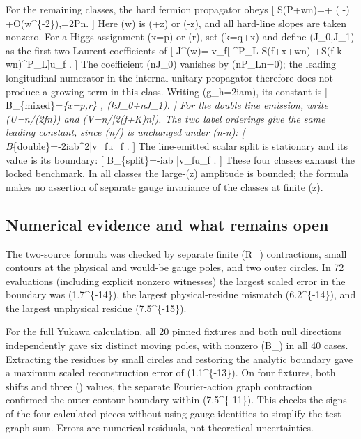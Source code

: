 \documentclass[
  11pt,
]{article}
\begin{document}
For the remaining classes, the hard fermion propagator obeys {[}
S(P+wn)=+ \left(
-\right)
+O(w\^{}\{-2\}),\qquad \ell=2P\cdot n. {]} Here (w) is (+z) or (-z), and
all hard-line slopes are taken nonzero. For a Higgs assignment (x=p) or
(r), set (k=q+x) and define (J\_0,J\_1) as the first two Laurent
coefficients of {[} J\^{}\alpha(w)=\bar v\_f{[} \gamma\^{}\alpha P\_L
S(f+x+wn) +S(f-k-wn)\gamma\^{}\alpha P\_L{]}u\_f . {]} The coefficient
(n\cdot J\_0) vanishes by (\not nP\_L\not n=0); the leading longitudinal
numerator in the internal unitary propagator therefore does not produce
a growing term in this class. Writing (g\_h=2iam), its constant is {[}
B\_\{\rm mixed\}=\sum\emph{\{x=p,r\}
, (k\cdot J\_0+n\cdot J\_1).
{]} For the double line emission, write (U=\not n/(2f\cdot n)) and
(V=\not n/{[}2(f+K)\cdot n{]}). The two label orderings give the same
leading constant, since (\not n/\ell) is unchanged under (n\to-n): {[}
B}\{\rm double\}=-2iab\^{}2\bar v\_f\big[
 W S(f+p+r)U+V W U+V S(f+K)W\big]u\_f . {]} The line-emitted scalar
split is stationary and its value is its boundary: {[}
B\_\{\rm split\}=-iab
\bar v\_f\big[W S(f+p+r)+S(f+K)W\big]u\_f . {]} These four classes
exhaust the locked benchmark. In all classes the large-(z) amplitude is
bounded; the formula makes no assertion of separate gauge invariance of
the classes at finite (z).

\subsection{Numerical evidence and what remains
open}\label{numerical-evidence-and-what-remains-open}

The two-source formula was checked by separate finite (R\_\xi)
contractions, small contours at the physical and would-be gauge poles,
and two outer circles. In 72 evaluations (including explicit nonzero
witnesses) the largest scaled error in the boundary was
(1.7\^{}\{-14\}), the largest physical-residue mismatch
(6.2\^{}\{-14\}), and the largest unphysical residue
(7.5\^{}\{-15\}).

For the full Yukawa calculation, all 20 pinned fixtures and both null
directions independently gave six distinct moving poles, with nonzero
(B\_\infty) in all 40 cases. Extracting the residues by small circles
and restoring the analytic boundary gave a maximum scaled reconstruction
error of (1.1\^{}\{-13\}). On four fixtures, both shifts and
three (\xi) values, the separate Fourier-action graph contraction
confirmed the outer-contour boundary within (7.5\^{}\{-11\}).
This checks the signs of the four calculated pieces without using gauge
identities to simplify the test graph sum. Errors are numerical
residuals, not theoretical uncertainties.
\end{document}
